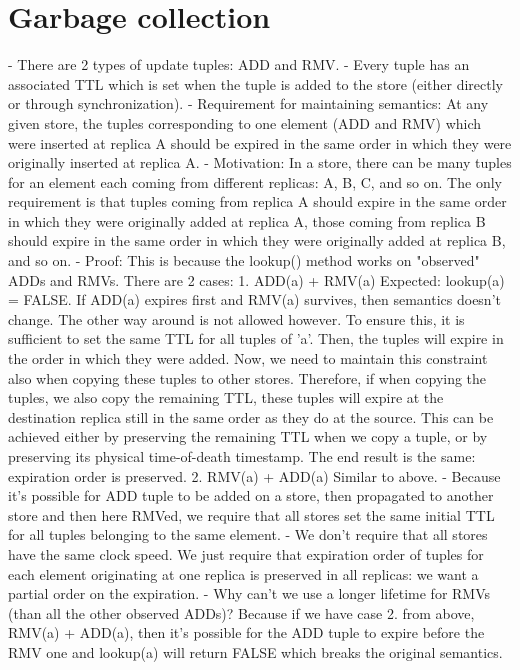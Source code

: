 \clearpage

\section{Garbage collection}

\begin{spverbatim}
- There are 2 types of update tuples: ADD and RMV.
- Every tuple has an associated TTL which is set when the tuple is added to the store (either directly or through synchronization).
- Requirement for maintaining semantics: At any given store, the tuples corresponding to one element (ADD and RMV) which were inserted at replica A should be expired in the same order in which they were originally inserted at replica A.
- Motivation: In a store, there can be many tuples for an element each coming from different replicas: A, B, C, and so on. The only requirement is that tuples coming from replica A should expire in the same order in which they were originally added at replica A, those coming from replica B should expire in the same order in which they were originally added at replica B, and so on.
- Proof: This is because the lookup() method works on "observed" ADDs and RMVs. There are 2 cases:
	1. ADD(a) + RMV(a)
	Expected: lookup(a) = FALSE. If ADD(a) expires first and RMV(a) survives, then semantics doesn't change. The other way around is not allowed however. To ensure this, it is sufficient to set the same TTL for all tuples of 'a'. Then, the tuples will expire in the order in which they were added. Now, we need to maintain this constraint also when copying these tuples to other stores. Therefore, if when copying the tuples, we also copy the remaining TTL, these tuples will expire at the destination replica still in the same order as they do at the source. This can be achieved either by preserving the remaining TTL when we copy a tuple, or by preserving its physical time-of-death timestamp. The end result is the same: expiration order is preserved.
	2. RMV(a) + ADD(a)
	Similar to above. 
- Because it's possible for ADD tuple to be added on a store, then propagated to another store and then here RMVed, we require that all stores set the same initial TTL for all tuples belonging to the same element.
- We don't require that all stores have the same clock speed. We just require that expiration order of tuples for each element originating at one replica is preserved in all replicas: we want a partial order on the expiration. 
- Why can't we use a longer lifetime for RMVs (than all the other observed ADDs)? Because if we have case 2. from above, RMV(a) + ADD(a), then it's possible for the ADD tuple to expire before the RMV one and lookup(a) will return FALSE which breaks the original semantics.



\end{spverbatim}
